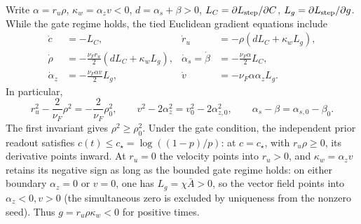 Write $\alpha=r_u\rho$, $\kappa_w=\alpha_z v<0$, $d=\alpha_s+\beta>0$,
$L_C=\partial L_{\mathrm{step}}/\partial C$, $L_g=\partial L_{\mathrm{step}}/\partial g$.
While the gate regime holds, the tied Euclidean gradient equations include
\begin{align}
 \dot c&=-L_C,
 &\dot r_u&=-\rho(dL_C+\kappa_w L_g),\label{eq:lr-factor-u}\\
 \dot\rho&=-\tfrac{\nu_F r_u}{2}(dL_C+\kappa_w L_g),
 &\dot \alpha_s=\dot\beta&=-\tfrac{\nu_F\alpha}{2}L_C,\\
 \dot \alpha_z&=-\tfrac{\nu_F\alpha v}{2}L_g,
 &\dot v&=-\nu_F\alpha \alpha_z L_g.
 \label{eq:lr-factor-bv}
\end{align}
In particular,
\begin{equation}\label{eq:lr-factor-invariants}
 r_u^2-\frac{2}{\nu_F}\rho^2=-\frac{2}{\nu_F}\rho_0^2,
 \qquad
 v^2-2\alpha_z^2=v_0^2-2\alpha_{z,0}^2,
 \qquad \alpha_s-\beta=\alpha_{s,0}-\beta_0.
\end{equation}
The first invariant gives $\rho^2\ge\rho_0^2$.  Under the gate
condition, the independent prior readout satisfies
$c(t)\le c_\star=\log((1-p)/p)$: at $c=c_\star$, with $r_u\rho\ge0$,
its derivative points inward.  At $r_u=0$ the velocity points into $r_u>0$,
and $\kappa_w=\alpha_z v$ retains its negative sign as long as the bounded gate regime
holds: on either boundary $\alpha_z=0$ or $v=0$, one has $L_g=\chi\bar A>0$,
so the vector field points into $\alpha_z<0,v>0$ (the simultaneous zero is excluded
by uniqueness from the nonzero seed). Thus $g=r_u\rho \kappa_w<0$ for positive times.

